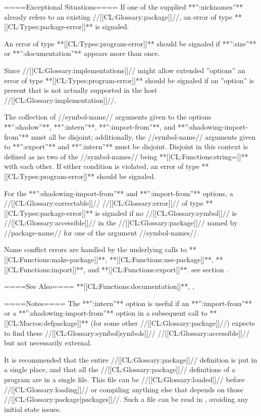 ====Exceptional Situations====
If one of the supplied **'':nicknames''** already refers to an existing //[[CL:Glossary:package]]//, an error of type **[[CL:Types:package-error]]** is signaled.

An error of type **[[CL:Types:program-error]]** should be signaled if **'':size''** or **'':documentation''** appears more than once.

Since //[[CL:Glossary:implementations]]// might allow extended ''options'' an error of type **[[CL:Types:program-error]]** should be signaled if an ''option'' is present that is not actually supported in the host //[[CL:Glossary:implementation]]//.

The collection of //symbol-name// arguments given to the options **'':shadow''**, **'':intern''**, **'':import-from''**, and **'':shadowing-import-from''** must all be disjoint; additionally, the //symbol-name// arguments given to **'':export''** and **'':intern''** must be disjoint. Disjoint in this context is defined as no two of the //symbol-names// being **[[CL:Functions:string=]]** with each other. If either condition is violated, an error of type **[[CL:Types:program-error]]** should be signaled.

For the **'':shadowing-import-from''** and **'':import-from''** options, a //[[CL:Glossary:correctable]]// //[[CL:Glossary:error]]// of type **[[CL:Types:package-error]]** is signaled if no //[[CL:Glossary:symbol]]// is //[[CL:Glossary:accessible]]// in the //[[CL:Glossary:package]]// named by //package-name// for one of the argument //symbol-names//.

Name conflict errors are handled by the underlying calls to **[[CL:Functions:make-package]]**, **[[CL:Functions:use-package]]**, **[[CL:Functions:import]]**, and **[[CL:Functions:export]]**. see section {\secref\PackageConcepts}.

====See Also====
**[[CL:Functions:documentation]]**, {\secref\PackageConcepts}, {\secref\Compilation}

====Notes====
The **'':intern''** option is useful if an **'':import-from''** or a **'':shadowing-import-from''** option in a subsequent call to **[[CL:Macros:defpackage]]** (for some other //[[CL:Glossary:package]]//) expects to find these //[[CL:Glossary:symbol|symbols]]// //[[CL:Glossary:accessible]]// but not necessarily external.


It is recommended that the entire //[[CL:Glossary:package]]// definition is put in a single place, and that all the //[[CL:Glossary:package]]// definitions of a program are in a single file. This file can be //[[CL:Glossary:loaded]]// before //[[CL:Glossary:loading]]// or compiling anything else that depends on those //[[CL:Glossary:package|packages]]//. Such a file can be read in , avoiding any initial state issues.

